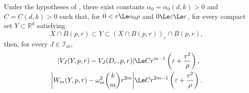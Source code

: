 \begin{theorem}
\label{thm:stabilite-projections}
Under the hypotheses of , there exist constants
$\alpha_0=\alpha_0(d,k)>0$ and $C=C(d,k)>0$ such that, for
$0<r\Le \alpha_0\rho$ and $0\Le\varepsilon\Le r$, for every compact
set $Y\subset\mathbb R^d$ satisfying
\begin{equation}
\label{eq:encadrement-Y}
    X\cap B(p,r) \subset Y
    \subset (X\cap B(p,r))_\varepsilon\cap B(p,r),
\end{equation}
then, for every $J\in\mathcal I_m$,
\begin{align}
\label{eq:stabilite-VJ}
\left|V_J(Y,p,r)-V_J(D_r,p,r)\right|
&\Le C r^{m-1}\left(\varepsilon+\frac{r^2}{\rho}\right),\\
\label{eq:stabilite-W}
\left|W_m(Y,p,r)-\omega_m^2\binom{k}{m}r^{2m}\right|
&\Le C r^{2m-1}\left(\varepsilon+\frac{r^2}{\rho}\right).
\end{align}
\end{theorem}
